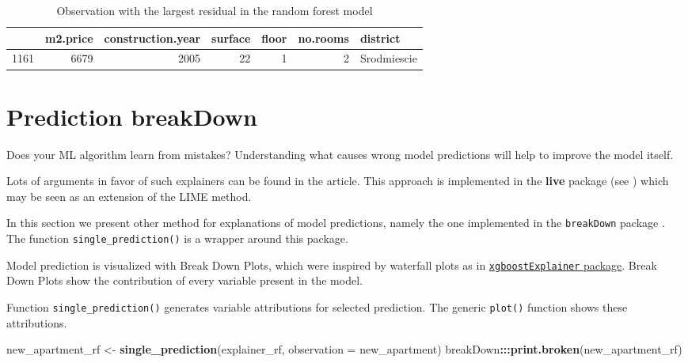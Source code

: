 \documentclass[]{book}
\newenvironment{Shaded}{\begin{snugshade}}{\end{snugshade}}
\newcommand{\DataTypeTok}[1]{\textcolor[rgb]{0.13,0.29,0.53}{#1}}
\newcommand{\KeywordTok}[1]{\textcolor[rgb]{0.13,0.29,0.53}{\textbf{#1}}}
\newcommand{\NormalTok}[1]{#1}
\newcommand{\OperatorTok}[1]{\textcolor[rgb]{0.81,0.36,0.00}{\textbf{#1}}}
\newcommand{\StringTok}[1]{\textcolor[rgb]{0.31,0.60,0.02}{#1}}
\theoremstyle{definition}
\theoremstyle{definition}
\theoremstyle{definition}
\theoremstyle{remark}
\begin{document}
\begin{table}

\caption{\label{tab:unnamed-chunk-21}Observation with the largest residual in the random forest model}
\centering
\begin{tabular}[t]{l|r|r|r|r|r|l}
\hline
  & m2.price & construction.year & surface & floor & no.rooms & district\\
\hline
1161 & 6679 & 2005 & 22 & 1 & 2 & Srodmiescie\\
\hline
\end{tabular}
\end{table}

\hypertarget{predictionBreakdown}{%
\section{Prediction breakDown}\label{predictionBreakdown}}

Does your ML algorithm learn from mistakes? Understanding what causes
wrong model predictions will help to improve the model itself.

Lots of arguments in favor of such explainers can be found in the
\citep{lime} article. This approach is implemented in the \textbf{live}
package (see \citep{live}) which may be seen as an extension of the LIME
method.

In this section we present other method for explanations of model
predictions, namely the one implemented in the \texttt{breakDown}
package \citep{breakDown}. The function \texttt{single\_prediction()} is
a wrapper around this package.

Model prediction is visualized with Break Down Plots, which were
inspired by waterfall plots as in
\href{https://github.com/AppliedDataSciencePartners/xgboostExplainer}{\texttt{xgboostExplainer}
package}. Break Down Plots show the contribution of every variable
present in the model.

Function \texttt{single\_prediction()} generates variable attributions
for selected prediction. The generic \texttt{plot()} function shows
these attributions.

\begin{Shaded}
\begin{Highlighting}[]
\NormalTok{new_apartment_rf <-}\StringTok{ }\KeywordTok{single_prediction}\NormalTok{(explainer_rf, }\DataTypeTok{observation =}\NormalTok{ new_apartment)}
\NormalTok{breakDown}\OperatorTok{:::}\KeywordTok{print.broken}\NormalTok{(new_apartment_rf)}
\end{Highlighting}
\end{Shaded}
\end{document}
